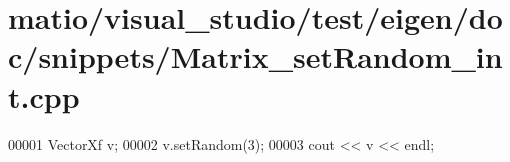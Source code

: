 \hypertarget{matio_2visual__studio_2test_2eigen_2doc_2snippets_2_matrix__set_random__int_8cpp_source}{}\section{matio/visual\+\_\+studio/test/eigen/doc/snippets/\+Matrix\+\_\+set\+Random\+\_\+int.cpp}
\label{matio_2visual__studio_2test_2eigen_2doc_2snippets_2_matrix__set_random__int_8cpp_source}

\begin{DoxyCode}
00001 VectorXf v;
00002 v.setRandom(3);
00003 cout << v << endl;
\end{DoxyCode}
